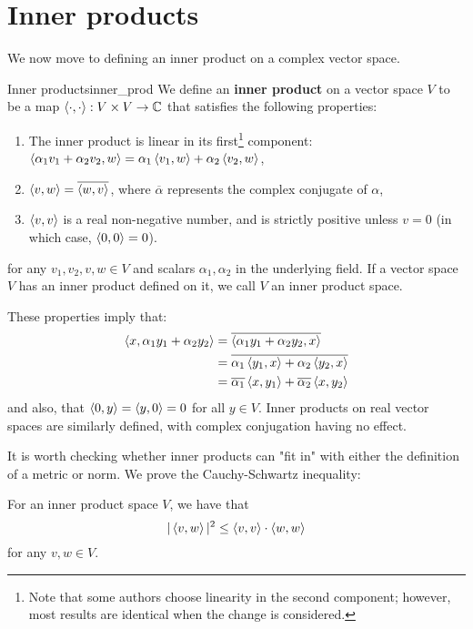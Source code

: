 \section{Inner products}

We now move to defining an inner product on a complex vector space.

\begin{bdefin}{Inner products}{inner_prod}
We define an \textbf{inner product} on a vector space $V$ to be a map $\left\langle \cdot, \cdot \right\rangle: V\times V \to \mathbb{C}$ that satisfies the following properties:
\begin{enumerate}
    \item The inner product is linear in its first\footnote{Note that some authors choose linearity in the second component; however, most results are identical when the change is considered.} component: $\left\langle \alpha_{1} v_{1} + \alpha_{2} v_{2}, w \right\rangle = \alpha_{1} \left\langle v_{1} , w \right\rangle + \alpha_{2} \left\langle v_{2}, w \right\rangle$,
    \item $\left\langle v, w \right\rangle = \overline{\left\langle w, v \right\rangle}$, where $\overline{\alpha}$ represents the complex conjugate of $\alpha$,
    \item $\left\langle v, v \right\rangle$ is a real non-negative number, and is strictly positive unless $v=0$ (in which case, $\left\langle 0, 0 \right\rangle=0$).
\end{enumerate}
for any $v_{1}, v_{2}, v, w \in V$ and scalars $\alpha_{1},\alpha_{2}$ in the underlying field. If a vector space $V$ has an inner product defined on it, we call $V$ an inner product space.
\end{bdefin}

These properties imply that:
\begin{equation}
    \begin{split}
        \left\langle x, \alpha_{1} y_{1} + \alpha_{2} y_{2} \right\rangle &= \overline{\left\langle \alpha_{1} y_{1} + \alpha_{2} y_{2}, x \right\rangle} \\
        &= \overline{\alpha_{1} \left\langle y_{1}, x \right\rangle + \alpha_{2} \left\langle y_{2}, x \right\rangle} \\
        &= \overline{\alpha_{1}} \left\langle x, y_{1} \right\rangle + \overline{\alpha_{2}} \left\langle x, y_{2} \right\rangle
    \end{split}
\end{equation}
and also, that \mbox{$\left\langle 0, y \right\rangle = \left\langle y, 0 \right\rangle = 0$} for all $y\in V$. Inner products on real vector spaces are similarly defined, with complex conjugation having no effect.

It is worth checking whether inner products can "fit in" with either the definition of a metric or norm. We prove the Cauchy-Schwartz inequality:
\begin{bprop}{}{}
For an inner product space $V$, we have that \[ |\left\langle v, w \right\rangle|^{2} \leq \left\langle v, v \right\rangle \cdot \left\langle w, w \right\rangle \] for any $v,w \in V$.
\end{bprop}

